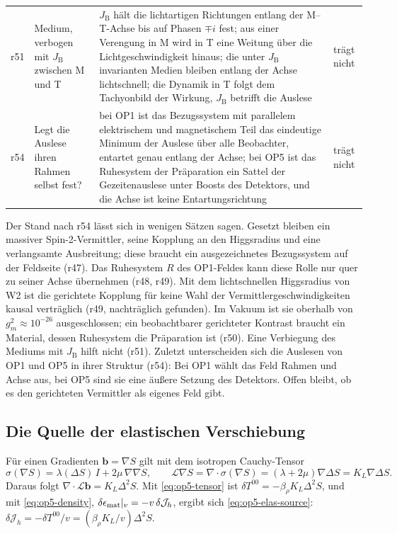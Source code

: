 \begin{center}
\begin{tabular}{@{}p{.07\linewidth}p{.25\linewidth}p{.43\linewidth}p{.15\linewidth}@{}}
r51 & Medium, verbogen mit \(J_{\mathrm B}\) zwischen M und T & \(J_{\mathrm B}\) hält die lichtartigen Richtungen entlang der M--T-Achse bis auf Phasen \(\mp i\) fest; aus einer Verengung in M wird in T eine Weitung über die Lichtgeschwindigkeit hinaus; die unter \(J_{\mathrm B}\) invarianten Medien bleiben entlang der Achse lichtschnell; die Dynamik in T folgt dem Tachyonbild der Wirkung, \(J_{\mathrm B}\) betrifft die Auslese & trägt nicht \\
r54 & Legt die Auslese ihren Rahmen selbst fest? & bei OP1 ist das Bezugssystem mit parallelem elektrischem und magnetischem Teil das eindeutige Minimum der Auslese über alle Beobachter, entartet genau entlang der Achse; bei OP5 ist das Ruhesystem der Präparation ein Sattel der Gezeitenauslese unter Boosts des Detektors, und die Achse ist keine Entartungsrichtung & trägt nicht \\
\hline
\end{tabular}
\end{center}

Der Stand nach r54 lässt sich in wenigen Sätzen sagen. Gesetzt bleiben ein massiver Spin-2-Vermittler, seine Kopplung an den Higgsradius
und eine verlangsamte Ausbreitung; diese braucht ein ausgezeichnetes Bezugssystem auf der Feldseite (r47). Das Ruhesystem \(R\) des
OP1-Feldes kann diese Rolle nur quer zu seiner Achse übernehmen (r48, r49). Mit dem lichtschnellen Higgsradius von W2 ist die gerichtete
Kopplung für keine Wahl der Vermittlergeschwindigkeiten kausal verträglich (r49, nachträglich gefunden). Im Vakuum ist sie oberhalb von
\(g_m^2\approx10^{-26}\) ausgeschlossen; ein beobachtbarer gerichteter Kontrast braucht ein Material, dessen Ruhesystem die Präparation ist
(r50). Eine Verbiegung des Mediums mit \(J_{\mathrm B}\) hilft nicht (r51). Zuletzt unterscheiden sich die Auslesen von OP1 und OP5 in ihrer Struktur
(r54): Bei OP1 wählt das Feld Rahmen und Achse aus, bei OP5 sind sie eine äußere Setzung des Detektors. Offen bleibt, ob es den gerichteten
Vermittler als eigenes Feld gibt.

\subsection{Die Quelle der elastischen Verschiebung}
\label{sec:anhang-b-quelle}

Für einen Gradienten \(\mathbf b=\nabla S\) gilt mit dem isotropen Cauchy-Tensor
\[
 \sigma(\nabla S)=\lambda(\Delta S)\,I+2\mu\,\nabla\nabla S,\qquad
 \mathcal L\nabla S=\nabla\cdot\sigma(\nabla S)=(\lambda+2\mu)\nabla\Delta S=K_L\nabla\Delta S .
\]
Daraus folgt \(\nabla\cdot\mathcal L\mathbf b=K_L\Delta^2S\). Mit \eqref{eq:op5-tensor} ist \(\delta T^{00}=-\beta_\rho K_L\Delta^2S\), und mit
\eqref{eq:op5-density}, \(\delta\epsilon_{\rm mat}|_v=-v\,\delta\mathcal J_h\), ergibt sich \eqref{eq:op5-elas-source}:
\(\delta\mathcal J_h=-\delta T^{00}/v=(\beta_\rho K_L/v)\Delta^2S\).

